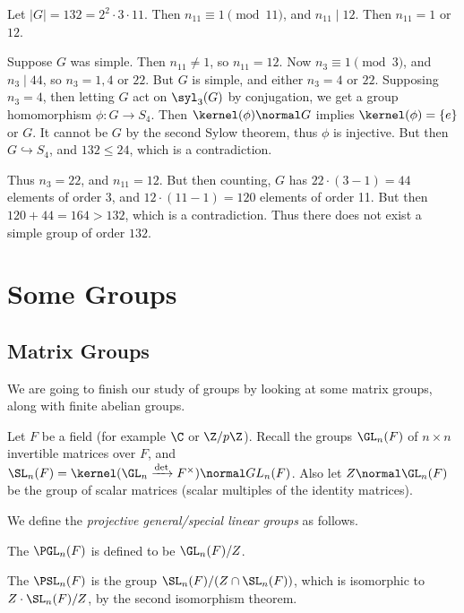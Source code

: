 \begin{example}
	Let $|G| = 132 = 2^2 \cdot 3 \cdot 11$. Then $n_{11} \equiv 1 \pmod{11}$, and $n_{11} \mid 12$. Then $n_{11} = 1$ or $12$.

	Suppose $G$ was simple. Then $n_{11} \neq 1$, so $n_{11} = 12$. Now $n_3 \equiv 1 \pmod{3}$, and $n_3 \mid 44$, so $n_3 = 1, 4$ or $22$. But $G$ is simple, and either $n_3 = 4$ or $22$. Supposing $n_3 = 4$, then letting $G$ act on $\syl_3(G)$ by conjugation, we get a group homomorphism $\phi: G \rightarrow S_4$. Then $\kernel(\phi) \normal G$ implies $\kernel(\phi) = \{e\}$ or $G$. It cannot be $G$ by the second Sylow theorem, thus $\phi$ is injective. But then $G \hookrightarrow S_4$, and $132 \leq 24$, which is a contradiction.

	Thus $n_3 = 22$, and $n_{11} = 12$. But then counting, $G$ has $22 \cdot (3 - 1) = 44$ elements of order 3, and $12 \cdot (11 - 1) = 120$ elements of order 11. But then $120 + 44 = 164 > 132$, which is a contradiction. Thus there does not exist a simple group of order $132$. 
\end{example}

\section{Some Groups}

\subsection{Matrix Groups}

We are going to finish our study of groups by looking at some matrix groups, along with finite abelian groups.


Let $F$ be a field (for example $\C$ or $\Z/p\Z$). 
Recall the groups $\GL_n(F)$ of $n \times n$ 
invertible matrices over $F$, and $\SL_n(F) = \kernel(\GL_n \xrightarrow{\det} F^\times) \normal GL_n(F)$.
Also let $Z \normal \GL_n(F)$ be the group of scalar matrices (scalar multiples of the identity matrices). 

We define the \emph{projective general/special linear groups} as follows.

\begin{definition}
	The  $\PGL_n(F)$ is defined to be $\GL_n(F) / Z$.
\end{definition}

\begin{definition}
	The  $\PSL_n(F)$ is the group $\SL_n(F) / (Z \cap  \SL_n(F))$, which is isomorphic to $Z\cdot \SL_n(F) / Z$, by the second isomorphism theorem.
\end{definition}

